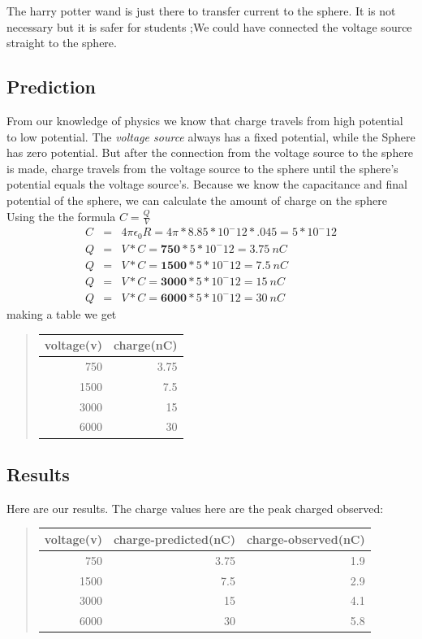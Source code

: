 \documentclass[12pt]{article}
\begin{document}
	 The harry potter wand is just there to transfer current to the sphere. It is not necessary but it is safer for students ;We could have connected the voltage source straight to the sphere. 

\subsection*{Prediction}
	From our knowledge of physics we know that charge travels from high potential to low potential. The \emph{voltage source} always has a fixed potential, while the Sphere has zero potential. But after the connection from the voltage source to the sphere is made, charge travels from the voltage source to the sphere until the sphere's potential equals the voltage source's. Because we know the capacitance and final potential of the sphere, we can calculate the amount of charge on the sphere Using the the formula $C = \frac{Q}{V}$ 
	\begin{eqnarray}
	C & = & 4\pi\epsilon_0R = 4 \pi *8.85*10^-12 *.045 = 5*10^-12\\
	Q &= & V * C = \mathbf{750} * 5 * 10^-12 = 3.75 \ nC \\
	Q &= & V * C = \mathbf{1500} * 5 * 10^-12 = 7.5 \ nC \\
	Q &= & V * C = \mathbf{3000} * 5 * 10^-12 = 15 \ nC \\
	Q &= & V * C = \mathbf{6000} * 5 * 10^-12 = 30 \ nC 
	\end{eqnarray}
	making a table we get
	\begin{quote}
	\begin{tabular}{|r|r|}
	\hline 
	voltage(v) & charge(nC) \\
	\hline 
	750 & 3.75 \\
	1500 & 7.5 \\
	3000 & 15 \\
	6000 & 30 \\
	\hline
	\end{tabular}
	\end{quote}

\subsection*{Results}
	Here are our results. The charge values here are the peak charged observed:
	\begin{quote}
	\begin{tabular}{|r|r|r|}
	\hline 
	voltage(v) & charge-predicted(nC) & charge-observed(nC) \\
	\hline 
	750 & 3.75 & 1.9 \\ 
	1500 & 7.5 & 2.9\\
	3000 & 15 & 4.1 \\
	6000 & 30 & 5.8 \\
	\hline
	\end{tabular}
	\end{quote}
	
\end{document}
